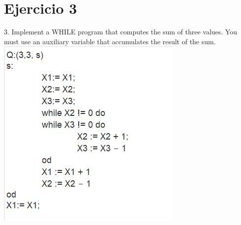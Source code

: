 \documentclass{article}
\begin{document}
\section{Ejercicio 3}
3. Implement a WHILE program that computes the sum of three values. You
must use an auxiliary variable that accumulates the result of the sum.
\includegraphics{imagen_2022-12-26_154006801.png}
\end{document}
